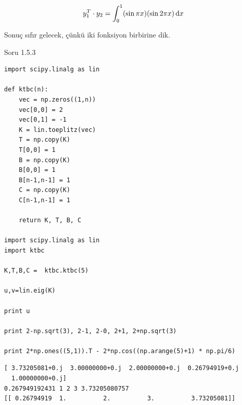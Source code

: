 \documentclass[12pt,fleqn]{article}\usepackage{../../common}
\begin{document}
$$ y_1^T \cdot y_2  = \int_0^1 (\sin \pi x)(\sin 2\pi x) \,\mathrm{d} x  $$ 

Sonuç sıfır gelecek, çünkü iki fonksiyon birbirine dik.

Soru 1.5.3

\begin{verbatim}
import scipy.linalg as lin

def ktbc(n):
    vec = np.zeros((1,n))
    vec[0,0] = 2
    vec[0,1] = -1
    K = lin.toeplitz(vec)
    T = np.copy(K)
    T[0,0] = 1
    B = np.copy(K)
    B[0,0] = 1
    B[n-1,n-1] = 1
    C = np.copy(K)
    C[n-1,n-1] = 1
    
    return K, T, B, C

import scipy.linalg as lin
import ktbc

K,T,B,C =  ktbc.ktbc(5)

u,v=lin.eig(K)

print u

print 2-np.sqrt(3), 2-1, 2-0, 2+1, 2+np.sqrt(3)

print 2*np.ones((5,1)).T - 2*np.cos((np.arange(5)+1) * np.pi/6)
\end{verbatim}

\begin{verbatim}
[ 3.73205081+0.j  3.00000000+0.j  2.00000000+0.j  0.26794919+0.j
  1.00000000+0.j]
0.267949192431 1 2 3 3.73205080757
[[ 0.26794919  1.          2.          3.          3.73205081]]
\end{verbatim}
\end{document}
